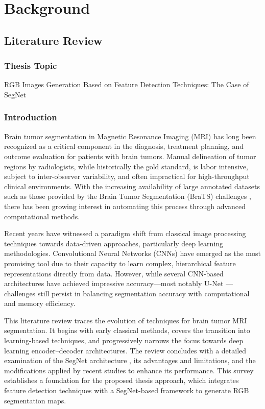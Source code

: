 \chapter{Background}
\label{chap:background}

\section{Literature Review}
\label{sec:literature_review}

\subsection{Thesis Topic}
\label{sec:thesis_topic}
RGB Images Generation Based on Feature Detection Techniques: The Case of SegNet

\subsection{Introduction}
\label{sec:lit_intro}
Brain tumor segmentation in Magnetic Resonance Imaging (MRI) has long been recognized as a critical component in the diagnosis, treatment planning, and outcome evaluation for patients with brain tumors. Manual delineation of tumor regions by radiologists, while historically the gold standard, is labor intensive, subject to inter-observer variability, and often impractical for high-throughput clinical environments. With the increasing availability of large annotated datasets such as those provided by the Brain Tumor Segmentation (BraTS) challenges \cite{menze2015brats,bakas2017brats,brats2020}, there has been growing interest in automating this process through advanced computational methods.

Recent years have witnessed a paradigm shift from classical image processing techniques towards data-driven approaches, particularly deep learning methodologies. Convolutional Neural Networks (CNNs) have emerged as the most promising tool due to their capacity to learn complex, hierarchical feature representations directly from data. However, while several CNN-based architectures have achieved impressive accuracy—most notably U-Net \cite{ronneberger2015unet}—challenges still persist in balancing segmentation accuracy with computational and memory efficiency.

This literature review traces the evolution of techniques for brain tumor MRI segmentation. It begins with early classical methods, covers the transition into learning-based techniques, and progressively narrows the focus towards deep learning encoder–decoder architectures. The review concludes with a detailed examination of the SegNet architecture \cite{badrinarayanan2017segnet}, its advantages and limitations, and the modifications applied by recent studies to enhance its performance. This survey establishes a foundation for the proposed thesis approach, which integrates feature detection techniques with a SegNet-based framework to generate RGB segmentation maps.

